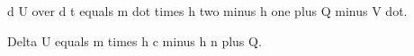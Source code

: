 d U over d t equals m dot times h two minus h one plus Q minus V dot.

Delta U equals m times h c minus h n plus Q.